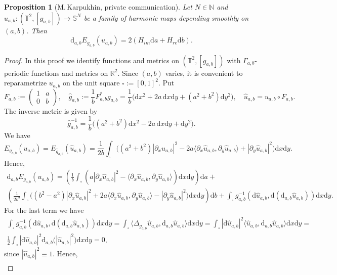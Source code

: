 \documentclass{amsart}
\renewcommand{\d}{\mathrm{d}}
\theoremstyle{plain}
\newtheorem{proposition}{Proposition}[section]
\theoremstyle{definition}
\theoremstyle{remark}
\begin{document}
\begin{proposition}[M.\,Karpukhin, private communication]\label{pr:ab-hopf}
Let \(N\in\mathbb N\) and \(u_{a,b}\colon (\mathbb T^2,[g_{a,b}])\to\mathbb
S^N\) be a family of harmonic maps depending smoothly on \((a,b)\). Then
\[
\d_{a,b}E_{g_{a,b}}(u_{a,b})=2(H_{im}\d a+H_{re}\d b).
\]
\end{proposition}

\begin{proof}
In this proof we identify functions and metrics on \((\mathbb T^2,[g_{a,b}])\)
with \(\Gamma_{a,b}\)-periodic functions and metrics on \(\mathbb R^2\). Since
\((a,b)\) varies, it is convenient to reparametrize \(u_{a,b}\) on the unit
square \(\square:=[0,1]^2\). Put
\[
F_{a,b}:=\begin{pmatrix} 1 & a\\ 0 & b\end{pmatrix},\quad
\hat g_{a,b}:=\frac{1}b F_{a,b}^* g_{a,b}=
\frac{1}b\bigl(\d x^2+2 a\,\d x\d y+(a^2+b^2)\d y^2\bigr),\quad
\hat u_{a,b}=u_{a,b}\circ F_{a,b}.
\]
The inverse metric is given by
\[
\hat g_{a,b}^{-1}=\frac{1}b\bigl((a^2+b^2)\d x^2-2a\,\d x\d y+\d y^2\bigr).
\]
We have
\[
E_{g_{a,b}}(u_{a,b})=E_{\hat g_{a,b}}(\hat u_{a,b})=
\frac{1}{2b}\int_\square\bigl((a^2+b^2)|\partial_x\hat u_{a,b}|^2-
2a\langle\partial_x\hat u_{a,b},\partial_y\hat u_{a,b}\rangle+
|\partial_y\hat u_{a,b}|^2\bigr)\d x\d y.
\]
Hence,
\begin{multline*}
\d_{a,b}E_{g_{a,b}}(u_{a,b})=
\left(\frac{1}b\int_\square (a|\partial_x\hat u_{a,b}|^2-
\langle\partial_x\hat u_{a,b},\partial_y\hat u_{a,b}\rangle)\d x\d y\right)
\d a+\\
\left(\frac{1}{2b^2}\int_\square\bigl((b^2-a^2)|\partial_x\hat u_{a,b}|^2+2a
\langle\partial_x\hat u_{a,b},\partial_y\hat u_{a,b}\rangle-
|\partial_y\hat u_{a,b}|^2\bigr)\d x\d y\right)\d b+
\int_\square g_{a,b}^{-1}(\d\hat u_{a,b},\d(\d_{a,b}\hat u_{a,b}))\d x\d y.
\end{multline*}
For the last term we have
\begin{multline*}
\int_\square g_{a,b}^{-1}(\d\hat u_{a,b},\d(\d_{a,b}\hat u_{a,b}))\d x\d y=
\int_\square\langle\Delta_{g_{a,b}}\hat u_{a,b},\d_{a,b}\hat u_{a,b}\rangle\d x\d y=
\int_\square|\d\hat u_{a,b}|^2\langle\hat u_{a,b},\d_{a,b}\hat u_{a,b}\rangle\d x\d y=\\
\frac{1}2\int_\square|\d\hat u_{a,b}|^2\d_{a,b}\bigl(|\hat u_{a,b}|^2\bigr)\d x\d y=0,
\end{multline*}
since \(|\hat u_{a,b}|^2\equiv 1\).
Hence,
\begin{multline*}

\end{multline*}
\end{proof}
\end{document}
